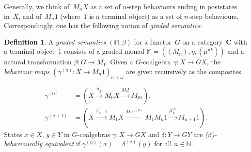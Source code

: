 \documentclass[a4paper,UKenglish,cleveref,thm-restate,numberwithinsect,final]{lipics-v2021}
\theoremstyle{plain}
\numberwithin{equation}{section}
\newcommand{\Nat}{{\mathbb{N}}}
\newcommand{\monad}{{\mathbb{M}}}
\newcommand{\+}[1]{\mathcal{#1}\xspace}
\newcommand{\BC}{\mathbf{C}}
\theoremstyle{definition}
\newtheorem{defn}[theorem]{Definition}
\begin{document}
  Generally, we think of~$M_nX$ as a set of $n$-step behaviours ending
  in poststates in~$X$, and of~$M_n1$ (where~$1$ is a terminal object)
  as a set of $n$-step behaviours. Correspondingly, one has the
  following notion of \emph{graded semantics}:
  \begin{defn}\label{defn:graded-semantics}
    A \emph{graded semantics} $(\monad,\beta)$ for a functor~$G$ on a
    category~$\BC$ with a terminal object~$1$ consists of a graded
    monad \(\monad=((M_n), \eta, (\mu^{nk}))\) and a natural
    transformation \(\beta: G \to M_1\).  Given a \(G\)-coalgebra
    \(\gamma\colon X \to GX\), the \emph{behaviour maps}
    $(\gamma^{(n)}\colon X\to M_n1)_{n<\omega}$ are given recursively as the composites    

    \begin{align*}
        \gamma^{(0)} & = (X \xrightarrow{\eta_X} M_0X \xrightarrow{M_0!} M_01), \\
        \gamma^{(n + 1)}&  = (X \xrightarrow{\beta_X \cdot \gamma} M_1X \xrightarrow{M_1\gamma^{(n)}} M_1M_n1 \xrightarrow{\mu^{1n}_X} M_{n+1}1).
    \end{align*}
    States $x\in X$, $y\in Y$ in $G$-coalgebras
    \(\gamma\colon X \to GX\) and $\delta\colon Y\to GY$ are
    \emph{($\beta$)-behaviourally equivalent} if
    \(\gamma^{(n)}(x) = \delta^{(n)}(y)\) for all \(n \in \Nat\).
\end{defn}
\end{document}
